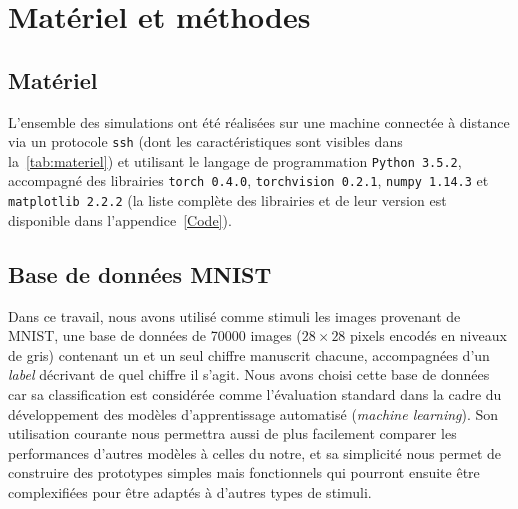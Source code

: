 \chapter{Matériel et méthodes} %
\label{Materiel_methode} %

\section{Matériel}
L'ensemble des simulations ont été réalisées sur une machine connectée à distance via un protocole \verb+ssh+ (dont les caractéristiques sont visibles dans la~\autoref{tab:materiel}) et utilisant le langage de programmation \verb+Python 3.5.2+, accompagné des librairies \verb+torch 0.4.0+, \verb+torchvision 0.2.1+, \verb+numpy 1.14.3+ et \verb+matplotlib 2.2.2+ (la liste complète des librairies et de leur version est disponible dans l'appendice~\ref{Code}).

\section{Base de données MNIST}
Dans ce travail, nous avons utilisé comme stimuli les images provenant de MNIST, une base de données de 70000 images ($28 \times 28$ pixels encodés en niveaux de gris) contenant un et un seul chiffre manuscrit chacune, accompagnées d'un \textit{label} décrivant de quel chiffre il s'agit. 
Nous avons choisi cette base de données car sa classification est considérée comme l'évaluation standard dans la cadre du développement des modèles d'apprentissage automatisé (\textit{machine learning}). Son utilisation courante nous permettra aussi de plus facilement comparer les performances d'autres modèles à celles du notre, et sa simplicité nous permet de construire des prototypes simples mais fonctionnels qui pourront ensuite être complexifiées pour être adaptés à d'autres types de stimuli.


